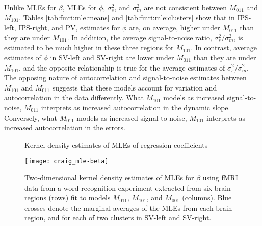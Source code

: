 Unlike MLEs for $\beta$, MLEs for $\phi$, $\sigma^2_s$, and $\sigma^2_m$ are not consistent between $M_{011}$ and $M_{101}$. Tables \ref{tab:fmri:mle:means} and \ref{tab:fmri:mle:clusters} show that in IPS-left, IPS-right, and PV, estimates for $\phi$ are, on average, higher under $M_{011}$ than they are under $M_{101}$.  In addition, the average signal-to-noise ratio, $\sigma^2_s / \sigma^2_m$, is estimated to be much higher in these three regions for $M_{101}$. In contrast, average estimates of $\phi$ in SV-left and SV-right are lower under $M_{011}$ than they are under $M_{101}$, and the opposite relationship is true for the average estimates of $\sigma^2_s / \sigma^2_m$. The opposing nature of autocorrelation and signal-to-noise estimates between $M_{101}$ and $M_{011}$ suggests that these models account for variation and autocorrelation in the data differently. What $M_{101}$ models as increased signal-to-noise, $M_{011}$ interprets as increased autocorrelation in the dynamic slope. Conversely, what $M_{011}$ models as increased signal-to-noise, $M_{101}$ interprets as increased autocorrelation in the errors.


\begin{figure}
\ssp
\centering
\caption{Kernel density estimates of MLEs of regression coefficients} \label{fig:fmri:mle:beta}
\texttt{[image: craig\_mle-beta]}
\caption*{Two-dimensional kernel density estimates of MLEs for $\beta$ using fMRI data from a word recognition experiment extracted from six brain regions (rows) fit to models $M_{011}$, $M_{101}$, and $M_{001}$ (columns). Blue crosses denote the marginal averages of the MLEs from each brain region, and for each of two clusters in SV-left and SV-right.}
\end{figure}

